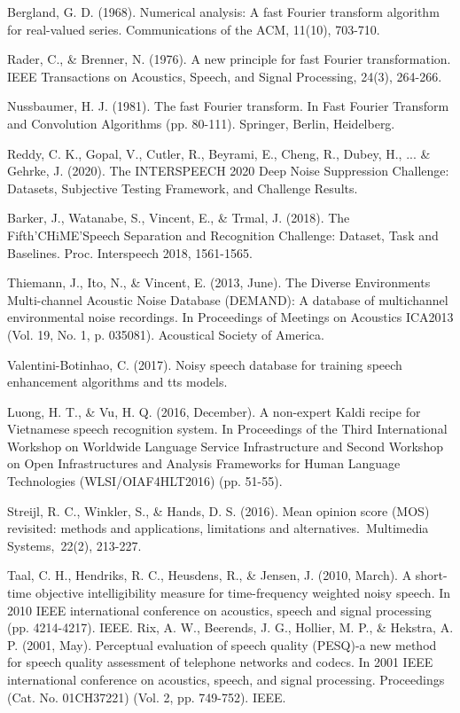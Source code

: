 \documentclass[a4paper, oneside, 13pt]{book}
\begin{document}
\begin{thebibliography}{80}
	Bergland, G. D. (1968). Numerical analysis: A fast Fourier transform algorithm for real-valued series. Communications of the ACM, 11(10), 703-710.
	
	Rader, C., \& Brenner, N. (1976). A new principle for fast Fourier transformation. IEEE Transactions on Acoustics, Speech, and Signal Processing, 24(3), 264-266.
	
	Nussbaumer, H. J. (1981). The fast Fourier transform. In Fast Fourier Transform and Convolution Algorithms (pp. 80-111). Springer, Berlin, Heidelberg.
	
	
	
	Reddy, C. K., Gopal, V., Cutler, R., Beyrami, E., Cheng, R., Dubey, H., ... \& Gehrke, J. (2020). The INTERSPEECH 2020 Deep Noise Suppression Challenge: Datasets, Subjective Testing Framework, and Challenge Results.
	
	Barker, J., Watanabe, S., Vincent, E., \& Trmal, J. (2018). The Fifth'CHiME'Speech Separation and Recognition Challenge: Dataset, Task and Baselines. Proc. Interspeech 2018, 1561-1565.
	
	Thiemann, J., Ito, N., \& Vincent, E. (2013, June). The Diverse Environments Multi-channel Acoustic Noise Database (DEMAND): A database of multichannel environmental noise recordings. In Proceedings of Meetings on Acoustics ICA2013 (Vol. 19, No. 1, p. 035081). Acoustical Society of America.
	
	Valentini-Botinhao, C. (2017). Noisy speech database for training speech enhancement algorithms and tts models.
	
	Luong, H. T., \& Vu, H. Q. (2016, December). A non-expert Kaldi recipe for Vietnamese speech recognition system. In Proceedings of the Third International Workshop on Worldwide Language Service Infrastructure and Second Workshop on Open Infrastructures and Analysis Frameworks for Human Language Technologies (WLSI/OIAF4HLT2016) (pp. 51-55).
	
	
	
	
	Streijl, R. C., Winkler, S., \& Hands, D. S. (2016). Mean opinion score (MOS) revisited: methods and applications, limitations and alternatives. Multimedia Systems, 22(2), 213-227.
	
	Taal, C. H., Hendriks, R. C., Heusdens, R., \& Jensen, J. (2010, March). A short-time objective intelligibility measure for time-frequency weighted noisy speech. In 2010 IEEE international conference on acoustics, speech and signal processing (pp. 4214-4217). IEEE.
	Rix, A. W., Beerends, J. G., Hollier, M. P., \& Hekstra, A. P. (2001, May). Perceptual evaluation of speech quality (PESQ)-a new method for speech quality assessment of telephone networks and codecs. In 2001 IEEE international conference on acoustics, speech, and signal processing. Proceedings (Cat. No. 01CH37221) (Vol. 2, pp. 749-752). IEEE.
	

\end{thebibliography}
\end{document}
